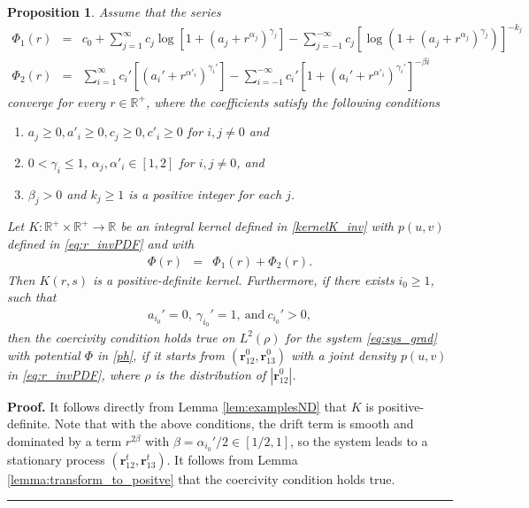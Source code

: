 \documentclass[]{elsarticle}
\def\R{\mathbb{R}}
\newcommand{\mbf}[1]{\boldsymbol{#1}}
\newcommand{\br}{\mbf{r}}
\newtheorem{proposition}[theorem]{Proposition}
\newtheorem{remark}[theorem]{Remark}
\newenvironment{proof}[1][Proof]{\noindent\textbf{#1.} }{\ \rule{0.5em}{0.5em}}
\numberwithin{equation}{section}
\numberwithin{theorem}{section}
\begin{document}
\begin{proposition} Assume that the series 
\begin{eqnarray}
\Phi_1(r)&=&c_0+\sum_{j=1}^{\infty}c_j\log\left[1+(a_j+r^{\alpha_j})^{\gamma_j}\right]
-\sum_{j=-1}^{-\infty}c_j[\log(1+(a_j+r^{\alpha_j})^{\gamma_j})]^{-k_j}\label{ps1}\\
\Phi_2(r)&=&\sum_{i=1}^{\infty}c_i'[(a_i'+r^{\alpha'_i})^{\gamma_i'}]-\sum_{i=-1}^{-\infty}c_i'[1+(a_i'+r^{\alpha'_i})^{\gamma_i'}]^{-\beta i}\label{ps2}
\end{eqnarray}
converge for every $r\in \R^+$, where the coefficients satisfy the following conditions
\begin{enumerate}
\item $a_j\geq 0, a'_i\geq 0, c_j\geq 0, c'_i\geq 0$ for $i,j\neq 0$ and
\item $0<\gamma_i\leq 1$, $ \alpha_j, \alpha'_i\in [1,2]$ for $i,j\neq 0$, and
\item $\beta_j>0$ and $k_j\geq 1$ is a positive integer for each $j$.
 \end{enumerate}
 Let $K: \R^+\times \R^+\to\R$ be an integral kernel defined in \eqref{kernelK_inv} with $p(u,v)$ defined in \eqref{eq:r_invPDF} and with 
 \begin{eqnarray}
\Phi(r)&=&\Phi_1(r)+\Phi_2(r). \label{ph}
\end{eqnarray}
Then  $K(r,s)$ is a positive-definite kernel. Furthermore, if there exists $i_0\geq 1$, such that 
\begin{align}
a_{i_0}'=0,\ \gamma_{i_0}'=1,\ \mathrm{and}\ c_{i_0}'>0,\label{ccb}
\end{align}
then the coercivity condition holds true on $L^2(\rho)$ for the system \eqref{eq:sys_grad} with potential $\Phi$ in \eqref{ph}, if it starts from $(\br_{12}^0,\br_{13}^0)$ with a joint density $p(u,v)$ in \eqref{eq:r_invPDF}, where $\rho$ is the distribution of $|\br_{12}^0|$. 
\end{proposition}
\begin{proof}
It follows directly from Lemma \ref{lem:examplesND} that $K$ is positive-definite. Note that with the above conditions, the drift term is smooth and dominated by a term $r^{2\beta}$ with $\beta= \alpha_{i_0}'/2 \in [1/2,1]$, so the system leads to a stationary process $(\br_{12}^t,\br_{13}^t)$.  It follows from Lemma \ref{lemma:transform_to_positve} that the coercivity condition holds true.   
\end{proof}
\end{document}
